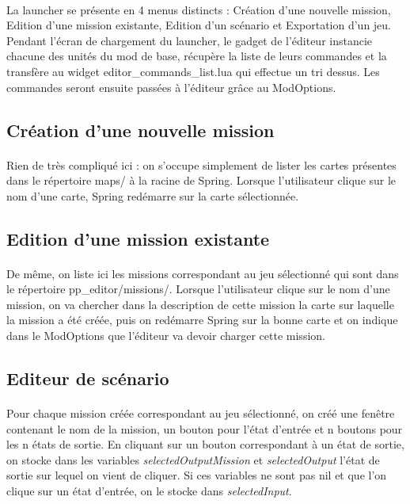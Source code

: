 \documentclass[a4paper]{article}
\begin{document}
\paragraph{}
La launcher se présente en 4 menus distincts : Création d'une nouvelle mission, Edition d'une mission existante, Edition d'un scénario et Exportation d'un jeu. Pendant l'écran de chargement du launcher, le gadget de l'éditeur instancie chacune des unités du mod de base, récupère la liste de leurs commandes et la transfère au widget editor\_commands\_list.lua qui effectue un tri dessus. Les commandes seront ensuite passées à l'éditeur grâce au ModOptions.
\subsection{Création d'une nouvelle mission}
\paragraph{}
Rien de très compliqué ici : on s'occupe simplement de lister les cartes présentes dans le répertoire maps/ à la racine de Spring. Lorsque l'utilisateur clique sur le nom d'une carte, Spring redémarre sur la carte sélectionnée.
\subsection{Edition d'une mission existante}
\paragraph{}
De même, on liste ici les missions correspondant au jeu sélectionné qui sont dans le répertoire pp\_editor/missions/. Lorsque l'utilisateur clique sur le nom d'une mission, on va chercher dans la description de cette mission la carte sur laquelle la mission a été créée, puis on redémarre Spring sur la bonne carte et on indique dans le ModOptions que l'éditeur va devoir charger cette mission.
\subsection{Editeur de scénario}
\paragraph{}
Pour chaque mission créée correspondant au jeu sélectionné, on créé une fenêtre contenant le nom de la mission, un bouton pour l'état d'entrée et n boutons pour les n états de sortie. En cliquant sur un bouton correspondant à un état de sortie, on stocke dans les variables \textit{selectedOutputMission} et \textit{selectedOutput} l'état de sortie sur lequel on vient de cliquer. Si ces variables ne sont pas nil et que l'on clique sur un état d'entrée, on le stocke dans \textit{selectedInput}.
\end{document}
